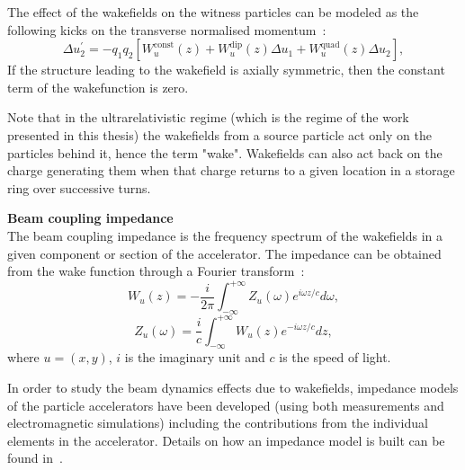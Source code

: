 The effect of the wakefields on the witness particles can be modeled as the following kicks on the transverse normalised momentum~\cite{Schenk:2665819}: %
\begin{equation}\label{eq:wakefield_kicks}
    \Delta u_2^\prime  = -q_1 q_2[W^\mathrm{const}_u(z) + W^\mathrm{dip}_u(z)\Delta u_1 +  W^\mathrm{quad}_u(z)\Delta u_2],
\end{equation}
If the structure leading to the wakefield is axially symmetric, then the constant term of the wakefunction is zero. 


Note that in the ultrarelativistic regime (which is the regime of the work presented in this thesis) the wakefields from a source particle act only on the particles behind it, hence the term "wake". Wakefields can also act back on the charge generating them when that charge returns to a given location in a storage ring over successive turns.


\textbf{Beam coupling impedance}\\
The beam coupling impedance is the frequency spectrum of the wakefields in a given component or section of the accelerator. The impedance can be obtained from the wake function through a Fourier transform~\cite{Chao:collective}: %
\begin{equation}\label{eq:wakes_to_impedance}
    W_u(z) = - \frac{i}{ 2\pi} \int_{- \infty}^{+\infty} Z_u(\omega) e^{i \omega z/c} d\omega,
\end{equation}
\begin{equation}\label{eq:impedance_to_wakes}
    Z_u(\omega) = \frac{i}{c} \int_{- \infty}^{+\infty} W_u(z) e^{-i \omega z/c} dz,
\end{equation}
where $u=(x,y)$, $i$ is the imaginary unit and $c$ is the speed of light.


In order to study the beam dynamics effects due to wakefields, impedance models of the particle accelerators have been developed (using both measurements and electromagnetic simulations) including the contributions from the individual elements in the accelerator. Details on how an impedance model is built can be found in~\cite{benoit_ipac19_impedance}.



